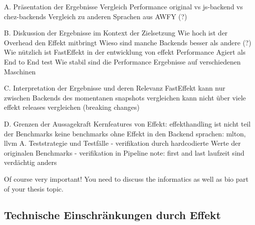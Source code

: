 		
A. Präsentation der Ergebnisse
    Vergleich Performance original vs js-backend vs chez-backends
    Vergleich zu anderen Sprachen aus AWFY (?)
    
B. Diskussion der Ergebnisse im Kontext der Zielsetzung
    Wie hoch ist der Overhead den Effekt mitbringt
    Wieso sind manche Backends besser als andere (?)
    Wie nützlich ist FastEffekt in der entwicklung von effekt
        Performance
        Agiert als End to End test
    Wie stabil sind die Performance Ergebnisse auf verschiedenen Maschinen
    
C. Interpretation der Ergebnisse und deren Relevanz
    FastEffekt kann nur zwischen Backends des momentanen snapshots vergleichen
    kann nicht über viele effekt releases vergleichen (breaking changes)

D. Grenzen der Aussagekraft
    Kernfeatures von Effekt: effekthandling ist nicht teil der Benchmarks
    keine benchmarks ohne Effekt in den Backend sprachen: mlton, llvm
    A. Teststrategie und Testfälle
        - verifikation durch hardcodierte Werte der originalen Benchmarks
        - verifikation in Pipeline	
        note: first and last laufzeit sind verdächtig anders

Of course very important! You need to discuss the informatics as well as bio part of your thesis topic.

\subsection{ Technische Einschränkungen durch Effekt }
